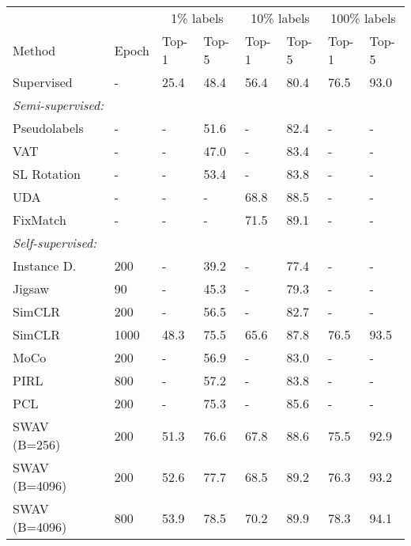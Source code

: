 \documentclass[10pt,twocolumn,letterpaper]{article}
\begin{document}
\begin{table}[t!]
\scriptsize
\centering
\begin{tabular}{@{}lp{18pt}|p{18pt}@{}p{18pt}@{}|p{18pt}@{}p{18pt}|p{18pt}@{}p{18pt}}\toprule
&   & \multicolumn{2}{c|}{1\% labels} & \multicolumn{2}{c|}{10\% labels} & \multicolumn{2}{c}{100\% labels} \\
 Method   & Epoch & Top-1 &  Top-5  & Top-1 &  Top-5 & Top-1 &  Top-5  \\ 
\hline
 Supervised~~ &  -  &  25.4 & 48.4 & 56.4 & 80.4 & 76.5 & 93.0\\
\hline
\multicolumn{6}{l}{{\hspace{-3mm} \em Semi-supervised: }}  \\
\hline
Pseudolabels~\cite{zhai2019s4l} &  - & - &  51.6 & - &82.4 & - & -\\
VAT ~\cite{miyato2018virtual,zhai2019s4l} & -  & - & 47.0 & - & 83.4 & - & -\\
SL Rotation~\cite{zhai2019s4l} & - & - &  53.4 & - & 83.8 & - & -\\
UDA~\cite{xie2019unsupervised}  & - & - & - & 68.8 & 88.5 & - & -\\
FixMatch & - & - & - & 71.5  & 89.1 & - & -\\
   \hline
\multicolumn{6}{l}{{\hspace{-3mm} \em Self-supervised: }}  \\
\hline
Instance D.~\cite{wu2018unsupervised} & 200 &  - &   39.2 & - & 77.4& - & - \\
Jigsaw~\cite{noroozi2016unsupervised} & 90 & - & 45.3 & - &  79.3 & - & -\\
SimCLR~\cite{chen2020simple} & 200 & - & 56.5 & - & 82.7 & - & -\\
SimCLR~\cite{chen2020simple} & 1000 & 48.3 & 75.5 & 65.6  & 87.8 & 76.5 & 93.5\\
MoCo~\cite{he2020momentum} & 200 & - & 56.9 & - & 83.0 & - & -\\        
PIRL~\cite{misra2020self} & 800 & - & 57.2 & - & 83.8 & - & -\\
PCL~\cite{li2020prototypical} & 200 & - & 75.3 & - & 85.6 & - & -\\
SWAV \!(B=256)\!~\cite{caron2020unsupervised} & 200 & 51.3 & 76.6 & 67.8 & 88.6  & 75.5 & 92.9 \\
SWAV \!(B=4096)\!~\cite{caron2020unsupervised} & 200 & 52.6 & 77.7 & 68.5 & 89.2  & 76.3 & 93.2 \\
SWAV \!(B=4096)\!~\cite{caron2020unsupervised} & 800 & 53.9 & 78.5 & 70.2 & 89.9 & 78.3 & 94.1\\ 

\end{tabular}
\end{table}
\end{document}
